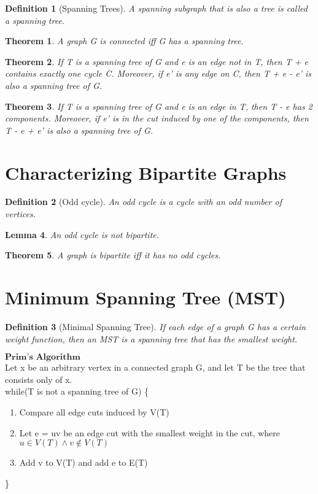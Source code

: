 \documentclass[11pt, oneside]{book}
\theoremstyle{break}
\newtheorem{thm}{Theorem}[section]
\newtheorem{lemma}[thm]{Lemma}
\newtheorem{defn}{Definition}[section]
\begin{document}
\begin{defn}[Spanning Trees]
	A spanning subgraph that is also a tree is called a spanning tree.
\end{defn}

\begin{thm}
	A graph G is connected iff G has a spanning tree.
\end{thm}

\begin{thm}
	If T is a spanning tree of G and e is an edge not in T, then T + e contains exactly one cycle C. Moreover, if e' is any edge on C, then T + e - e' is also a spanning tree of G.
\end{thm}

\begin{thm}
	If T is a spanning tree of G and e is an edge in T, then T - e has 2 components. Moreover, if e' is in the cut induced by one of the components, then T - e + e' is also a spanning tree of G.
\end{thm}


\section{Characterizing Bipartite Graphs}

\begin{defn}[Odd cycle]
	An odd cycle is a cycle with an odd number of vertices.
\end{defn}

\begin{lemma}
	An odd cycle is not bipartite.
\end{lemma}

\begin{thm}
	A graph is bipartite iff it has no odd cycles.
\end{thm}


\section{Minimum Spanning Tree (MST)}

\begin{defn}[Minimal Spanning Tree]
	If each edge of a graph G has a certain weight function, then an MST is a spanning tree that has the smallest weight.
\end{defn}

$\textbf{Prim's Algorithm}$ \\
Let x be an arbitrary vertex in a connected graph G, and let T be the tree that consists only of x. \\
while(T is not a spanning tree of G) \{
	\begin{enumerate}
		\item Compare all edge cuts induced by V(T)
		\item Let e = uv be an edge cut with the smallest weight in the cut, where $u \in V(T) \land v \notin V(T)$
		\item Add v to V(T) and add e to E(T)
	\end{enumerate}
\}
\end{document}
